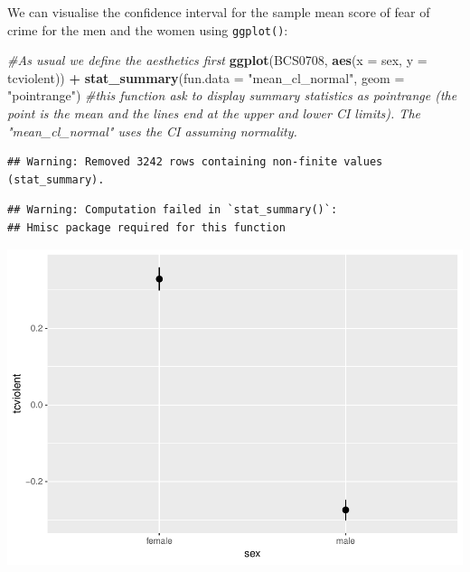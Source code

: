 \documentclass[]{book}
\newenvironment{Shaded}{\begin{snugshade}}{\end{snugshade}}
\newcommand{\CommentTok}[1]{\textcolor[rgb]{0.56,0.35,0.01}{\textit{#1}}}
\newcommand{\DataTypeTok}[1]{\textcolor[rgb]{0.13,0.29,0.53}{#1}}
\newcommand{\KeywordTok}[1]{\textcolor[rgb]{0.13,0.29,0.53}{\textbf{#1}}}
\newcommand{\NormalTok}[1]{#1}
\newcommand{\OperatorTok}[1]{\textcolor[rgb]{0.81,0.36,0.00}{\textbf{#1}}}
\newcommand{\StringTok}[1]{\textcolor[rgb]{0.31,0.60,0.02}{#1}}
\theoremstyle{definition}
\theoremstyle{definition}
\theoremstyle{definition}
\theoremstyle{remark}
\begin{document}
We can visualise the confidence interval for the sample mean score of
fear of crime for the men and the women using \texttt{ggplot()}:

\begin{Shaded}
\begin{Highlighting}[]
\CommentTok{#As usual we define the aesthetics first}
\KeywordTok{ggplot}\NormalTok{(BCS0708, }\KeywordTok{aes}\NormalTok{(}\DataTypeTok{x =}\NormalTok{ sex, }\DataTypeTok{y =}\NormalTok{ tcviolent)) }\OperatorTok{+}
\StringTok{        }\KeywordTok{stat_summary}\NormalTok{(}\DataTypeTok{fun.data =} \StringTok{"mean_cl_normal"}\NormalTok{, }\DataTypeTok{geom =} \StringTok{"pointrange"}\NormalTok{) }\CommentTok{#this function ask to display summary statistics as pointrange (the point is the mean and the lines end at the upper and lower CI limits). The "mean_cl_normal" uses the CI assuming normality.}
\end{Highlighting}
\end{Shaded}

\begin{verbatim}
## Warning: Removed 3242 rows containing non-finite values (stat_summary).
\end{verbatim}

\begin{verbatim}
## Warning: Computation failed in `stat_summary()`:
## Hmisc package required for this function
\end{verbatim}

\includegraphics{05-inference_files/figure-latex/unnamed-chunk-43-1.pdf}
\end{document}
